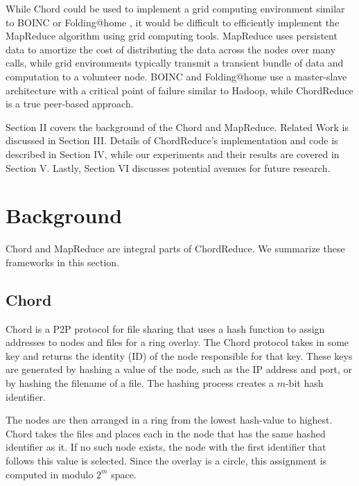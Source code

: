 \documentclass[10pt, conference, compsocconf]{IEEEtran}
\begin{document}
While Chord could be used to implement a grid computing environment similar to BOINC \cite{boinc} or Folding@home \cite{folding}, it would be difficult to efficiently implement the MapReduce algorithm using grid computing tools. MapReduce uses persistent data to amortize the cost of distributing the data across the nodes over many calls, while grid environments typically transmit a transient bundle of data and computation to a volunteer node. BOINC and Folding@home use a master-slave architecture with a critical point of failure similar to Hadoop, while ChordReduce is a true peer-based approach.

Section II covers the background  of the Chord and MapReduce.  Related Work is discussed in Section III. Details of ChordReduce's implementation and code is described in Section IV, while our experiments and their results are covered in Section V.  Lastly, Section VI discusses potential avenues for future research.



\section{Background}
Chord and MapReduce are integral parts of ChordReduce.  We summarize these frameworks in this section.
\subsection{Chord}
Chord \cite{Chord} is a P2P protocol for file sharing that uses a hash function to assign addresses to nodes and files for a ring overlay. The Chord protocol takes in some key and returns the identity (ID) of the node responsible for that key.  These keys are generated by hashing a value of the node, such as the IP address and port, or by hashing the filename of a file.  The hashing process creates a $m$-bit hash identifier.

The nodes are then arranged in a ring from the lowest hash-value to highest.  Chord takes the files and places each in the node that has the same hashed identifier as it.  If no such node exists, the node with the first identifier that follows this value is selected. Since the overlay is a circle, this assignment is computed in modulo $2^m$ space.  
\end{document}
